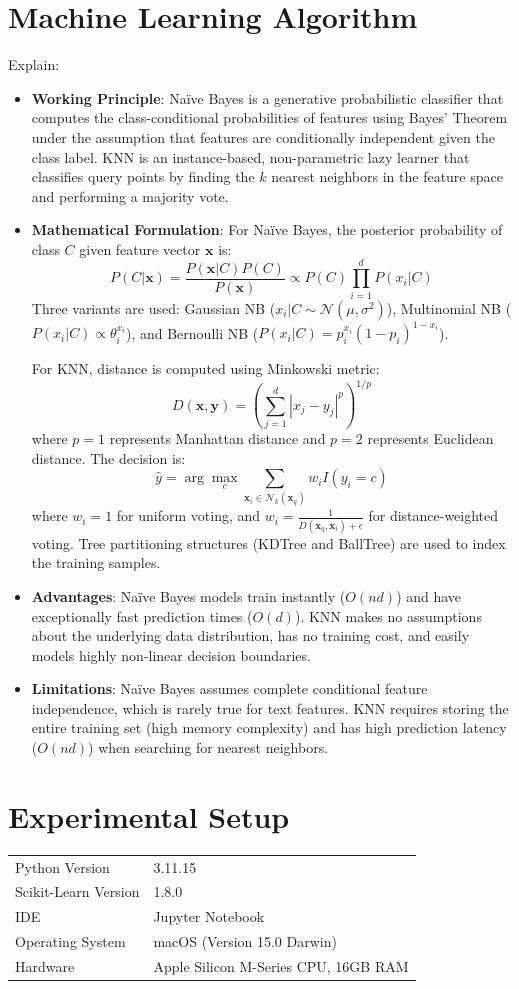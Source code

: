 \documentclass[12pt,a4paper]{article}
\begin{document}
\section{Machine Learning Algorithm}
Explain:
\begin{itemize}
\item \textbf{Working Principle}: 
Na\"ive Bayes is a generative probabilistic classifier that computes the class-conditional probabilities of features using Bayes' Theorem under the assumption that features are conditionally independent given the class label. KNN is an instance-based, non-parametric lazy learner that classifies query points by finding the $k$ nearest neighbors in the feature space and performing a majority vote.
\item \textbf{Mathematical Formulation}:
For Na\"ive Bayes, the posterior probability of class $C$ given feature vector $\mathbf{x}$ is:
$$P(C | \mathbf{x}) = \frac{P(\mathbf{x} | C) P(C)}{P(\mathbf{x})} \propto P(C) \prod_{i=1}^{d} P(x_i | C)$$
Three variants are used: Gaussian NB ($x_i|C \sim \mathcal{N}(\mu, \sigma^2)$), Multinomial NB ($P(x_i|C) \propto \theta_i^{x_i}$), and Bernoulli NB ($P(x_i|C) = p_i^{x_i}(1-p_i)^{1-x_i}$).

For KNN, distance is computed using Minkowski metric:
$$D(\mathbf{x}, \mathbf{y}) = \left( \sum_{j=1}^{d} |x_j - y_j|^p \right)^{1/p}$$
where $p=1$ represents Manhattan distance and $p=2$ represents Euclidean distance. The decision is:
$$\hat{y} = \arg\max_{c} \sum_{\mathbf{x}_i \in \mathcal{N}_k(\mathbf{x}_q)} w_i I(y_i = c)$$
where $w_i = 1$ for uniform voting, and $w_i = \frac{1}{D(\mathbf{x}_q, \mathbf{x}_i) + \epsilon}$ for distance-weighted voting. Tree partitioning structures (KDTree and BallTree) are used to index the training samples.
\item \textbf{Advantages}:
Na\"ive Bayes models train instantly ($O(nd)$) and have exceptionally fast prediction times ($O(d)$). KNN makes no assumptions about the underlying data distribution, has no training cost, and easily models highly non-linear decision boundaries.
\item \textbf{Limitations}:
Na\"ive Bayes assumes complete conditional feature independence, which is rarely true for text features. KNN requires storing the entire training set (high memory complexity) and has high prediction latency ($O(nd)$) when searching for nearest neighbors.
\end{itemize}

\section{Experimental Setup}
\begin{tabular}{ll}
\toprule
Python Version & 3.11.15 \\
Scikit-Learn Version & 1.8.0 \\
IDE & Jupyter Notebook\\
Operating System & macOS (Version 15.0 Darwin) \\
Hardware & Apple Silicon M-Series CPU, 16GB RAM \\
\bottomrule
\end{tabular}
\end{document}
